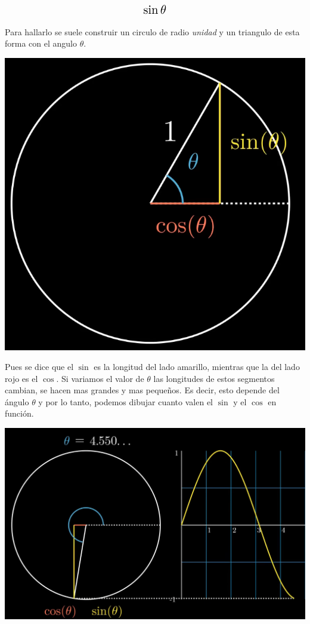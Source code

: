\documentclass[12pt, a4paper, oneside]{article}
\begin{document}
\[
  \scalebox{1.5}{$\sin\theta$}\\
\]

Para hallarlo se suele construir un circulo de radio \textit{unidad} y un triangulo de esta forma con el angulo $\theta$.\\

{
  \centering
  \includegraphics[scale=0.3]{./images/theta}
  \par
}

Pues se dice que el {\large $\sin$} es la longitud del lado amarillo,
mientras que la del lado rojo es el {\large $\cos$}. Si variamos el
valor de {\large $\theta$} las longitudes de estos segmentos cambian, se hacen mas grandes y mas pequeños. Es decir, esto depende del ángulo
{\large $\theta$} y por lo tanto, podemos dibujar cuanto valen el
{\large $\sin$} y el {\large $\cos$} en función.\\
\par

{
  \centering
  \includegraphics[scale=0.3]{./images/function}
  \par
}
\end{document}
